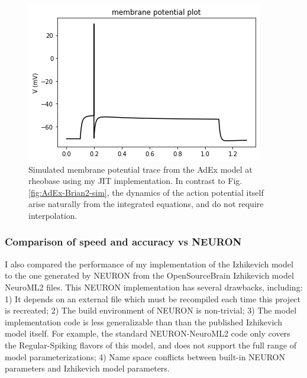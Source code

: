 \begin{figure}
\begin{center}
\includegraphics[scale=0.7]{figures/backend_check_files/backend_check_4_2}
\caption[JIT simulation of the AdEx model]{Simulated membrane potential trace from the AdEx model at rheobase using my JIT implementation. In contrast to Fig. \ref{fig:AdEx-Brian2-sim}, the dynamics of the action potential itself arise naturally from the integrated equations, and do not require interpolation.}
\label{fig:AdEx-JIT-sim}
\end{center}
\end{figure}


\subsubsection{Comparison of speed and accuracy vs NEURON}
I also compared the performance of my implementation of the Izhikevich model to the one generated by NEURON from the OpenSourceBrain Izhikevich model NeuroML2 files.
This NEURON implementation has several drawbacks, including: 1) It depends on an external file which must be recompiled each time this project is recreated; 2) The build environment of NEURON is non-trivial; 3) The model implementation code is less generalizable than than the published Izhikevich model itself.
For example, the standard NEURON-NeuroML2 code only covers the Regular-Spiking flavors of this model, and does not support the full range of model parameterizations; 4) Name space conflicts between built-in NEURON parameters and Izhikevich model parameters.  



